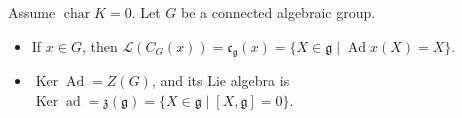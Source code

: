 Assume $\operatorname{char} K = 0$. Let $G$ be a connected algebraic group.
\begin{itemize}
\item[(a)] If $x \in G$, then $\mathcal{L}(C_G(x)) = \mathfrak{c}_{\mathfrak{g}}(x) = \{X \in \mathfrak{g} \mid \operatorname{Ad} x(X) = X\}$.
\item[(b)] $\operatorname{Ker} \operatorname{Ad} = Z(G)$, and its Lie algebra is $\operatorname{Ker} \operatorname{ad} = \mathfrak{z}(\mathfrak{g}) = \{X \in \mathfrak{g} \mid [X, \mathfrak{g}] = 0\}$.
\end{itemize}
